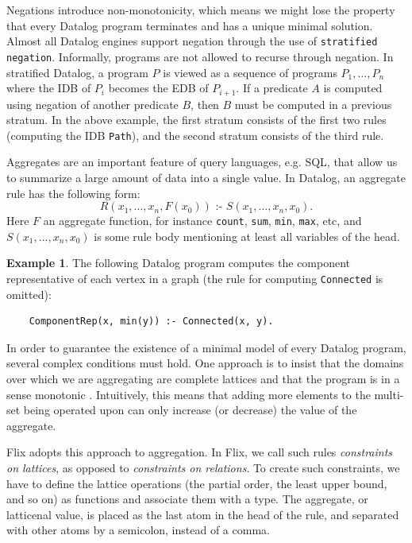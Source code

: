 \documentclass[11pt]{report}
\theoremstyle{definition}
\newtheorem{exmp}{Example}[chapter]
\begin{document}
Negations introduce non-monotonicity, which means we might lose the property that every Datalog program terminates and has a unique minimal solution. Almost all Datalog engines support negation through the use of \texttt{stratified negation}. Informally, programs are not allowed to recurse through negation. In stratified Datalog, a program $P$ is viewed as a sequence of programs $P_1, \ldots, P_n$ where the IDB of $P_i$ becomes the EDB of $P_{i+1}$. If a predicate $A$ is computed using negation of another predicate $B$, then $B$ must be computed in a previous stratum. In the above example, the first stratum consists of the first two rules (computing the IDB \texttt{Path}), and the second stratum consists of the third rule.

Aggregates are an important feature of query languages, e.g. SQL, that allow us to summarize a large amount of data into a single value. In Datalog, an aggregate rule has the following form:
$$R(x_1, \ldots, x_n, F(x_0)) \text{ :- } S(x_1, \ldots, x_n, x_0).$$
Here $F$ an aggregate function, for instance \texttt{count}, \texttt{sum}, \texttt{min}, \texttt{max}, etc, and $S(x_1, \ldots, x_n, x_0)$ is some rule body mentioning at least all variables of the head.

\begin{exmp}
  The following Datalog program computes the component representative of each vertex in a graph (the rule for computing \texttt{Connected} is omitted):
  \begin{verbatim}
    ComponentRep(x, min(y)) :- Connected(x, y).
  \end{verbatim}
\end{exmp}

In order to guarantee the existence of a minimal model of every Datalog program, several complex conditions must hold. One approach is to insist that the domains over which we are aggregating are complete lattices and that the program is in a sense monotonic \cite{ROSS199779}. Intuitively, this means that adding more elements to the multi-set being operated upon can only increase (or decrease) the value of the aggregate.

Flix adopts this approach to aggregation. In Flix, we call such rules \textit{constraints on lattices}, as opposed to \textit{constraints on relations}. To create such constraints, we have to define the lattice operations (the partial order, the least upper bound, and so on) as functions and associate them with a type. The aggregate, or latticenal value, is placed as the last atom in the head of the rule, and separated with other atoms by a semicolon, instead of a comma.
\end{document}
